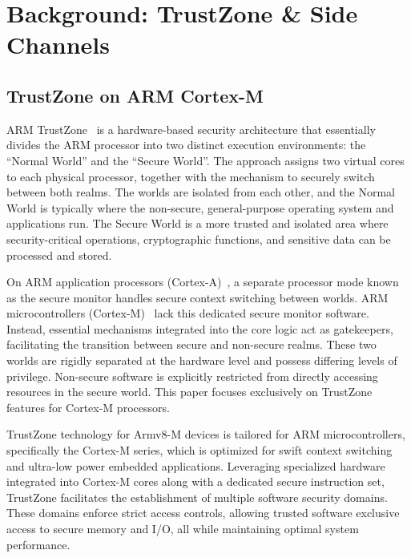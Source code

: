 \section{Background: TrustZone \& Side Channels} \label{sect:problem}

\subsection{TrustZone on ARM Cortex-M}

ARM TrustZone~\cite{DemystifyingAT, TZArchitecture} is a hardware-based
security architecture that essentially divides the ARM processor into two
distinct execution environments: the ``Normal World'' and the ``Secure
World''. The approach assigns two virtual cores to each physical processor,
together with the mechanism to securely switch between both realms. The
worlds are isolated from each other, and the Normal World is typically
where the non-secure, general-purpose operating system and applications
run. The Secure World is a more trusted and isolated area where
security-critical operations, cryptographic functions, and sensitive data
can be processed and stored.

On ARM application processors (Cortex-A)~\cite{TZA}, a separate processor
mode known as the secure monitor handles secure context switching between
worlds. ARM microcontrollers (Cortex-M)~\cite{TZM} lack this dedicated
secure monitor software. Instead, essential mechanisms integrated into the
core logic act as gatekeepers, facilitating the transition between secure
and non-secure realms. These two worlds are rigidly separated at the
hardware level and possess differing levels of privilege. Non-secure
software is explicitly restricted from directly accessing resources in the
secure world. This paper focuses exclusively on TrustZone features for
Cortex-M processors.

TrustZone technology for Armv8-M devices is tailored for ARM
microcontrollers, specifically the Cortex-M series, which is optimized for
swift context switching and ultra-low power embedded applications.
Leveraging specialized hardware integrated into Cortex-M cores along with a
dedicated secure instruction set, TrustZone facilitates the establishment
of multiple software security domains. These domains enforce strict access
controls, allowing trusted software exclusive access to secure memory and
I/O, all while maintaining optimal system performance.

